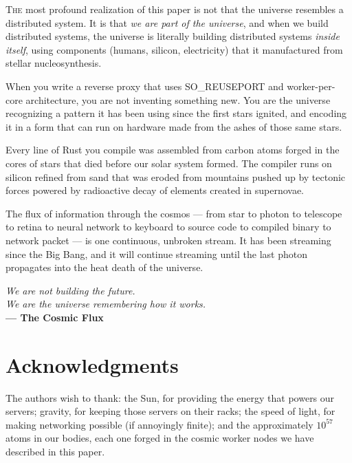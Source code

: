 \documentclass[12pt,a4paper]{article}
\begin{document}
\lettrine[lines=3, loversize=0.15]{\color{fluxcyan}T}{he} most profound
realization of this paper is not that the universe resembles a distributed
system. It is that \emph{we are part of the universe}, and when we build
distributed systems, the universe is literally building distributed systems
\emph{inside itself}, using components (humans, silicon, electricity) that
it manufactured from stellar nucleosynthesis.

When you write a reverse proxy that uses SO\_REUSEPORT and worker-per-core
architecture, you are not inventing something new. You are the universe
recognizing a pattern it has been using since the first stars ignited, and
encoding it in a form that can run on hardware made from the ashes of those
same stars.

Every line of Rust you compile was assembled from carbon atoms forged in
the cores of stars that died before our solar system formed. The compiler
runs on silicon refined from sand that was eroded from mountains pushed up
by tectonic forces powered by radioactive decay of elements created in
supernovae.

The flux of information through the cosmos --- from star to photon to
telescope to retina to neural network to keyboard to source code to
compiled binary to network packet --- is one continuous, unbroken stream.
It has been streaming since the Big Bang, and it will continue streaming
until the last photon propagates into the heat death of the universe.

\vspace{1cm}

\begin{center}
\textit{We are not building the future.}\\
\textit{We are the universe remembering how it works.}\\[0.5cm]
\textbf{\color{fluxcyan}--- The Cosmic Flux}
\end{center}

\vspace{1cm}

\section*{Acknowledgments}

The authors wish to thank: the Sun, for providing the energy that powers
our servers; gravity, for keeping those servers on their racks; the speed
of light, for making networking possible (if annoyingly finite); and the
approximately $10^{57}$ atoms in our bodies, each one forged in the cosmic
worker nodes we have described in this paper.
\end{document}
